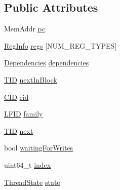 \subsection*{Public Attributes}
\begin{DoxyCompactItemize}
\item 
Mem\+Addr \hyperlink{struct_simulator_1_1drisc_1_1_thread_a7fa8ac02bc36f19ef8ad78b0f0321ec9}{pc}
\item 
\hyperlink{struct_simulator_1_1drisc_1_1_thread_1_1_reg_info}{Reg\+Info} \hyperlink{struct_simulator_1_1drisc_1_1_thread_ae8635cffb20ce2ecf310f28570078a26}{regs} \mbox{[}N\+U\+M\+\_\+\+R\+E\+G\+\_\+\+T\+Y\+P\+E\+S\mbox{]}
\item 
\hyperlink{struct_simulator_1_1drisc_1_1_thread_1_1_dependencies}{Dependencies} \hyperlink{struct_simulator_1_1drisc_1_1_thread_a6df908e33975ccc9179ddcfb074ac927}{dependencies}
\item 
\hyperlink{namespace_simulator_a483cc4ecee1736e895054617672cded5}{T\+I\+D} \hyperlink{struct_simulator_1_1drisc_1_1_thread_ac0fa51aa3834e85dcaf01b21281fef4d}{next\+In\+Block}
\item 
\hyperlink{namespace_simulator_a97f45fafcb1aafc0f269a19608b39d60}{C\+I\+D} \hyperlink{struct_simulator_1_1drisc_1_1_thread_aadcf9d1908b162ac43f9c2fd5292cc10}{cid}
\item 
\hyperlink{namespace_simulator_aaccbc706b2d6c99085f52f6dfc2333e4}{L\+F\+I\+D} \hyperlink{struct_simulator_1_1drisc_1_1_thread_afc1b826dfef0c2dd00dcadfed8e40f97}{family}
\item 
\hyperlink{namespace_simulator_a483cc4ecee1736e895054617672cded5}{T\+I\+D} \hyperlink{struct_simulator_1_1drisc_1_1_thread_acbfe721255a13b2fd1d188225ea29b99}{next}
\item 
bool \hyperlink{struct_simulator_1_1drisc_1_1_thread_a61342a620b15e75e994da0f550f5552a}{waiting\+For\+Writes}
\item 
uint64\+\_\+t \hyperlink{struct_simulator_1_1drisc_1_1_thread_a8eaae8a4a66039e986248da7f688e6b3}{index}
\item 
\hyperlink{namespace_simulator_a5450f6fb4b10ec16b290049311b8d5d0}{Thread\+State} \hyperlink{struct_simulator_1_1drisc_1_1_thread_a92b2fb9c99fbcaec471af66aa5ee70ae}{state}
\end{DoxyCompactItemize}


